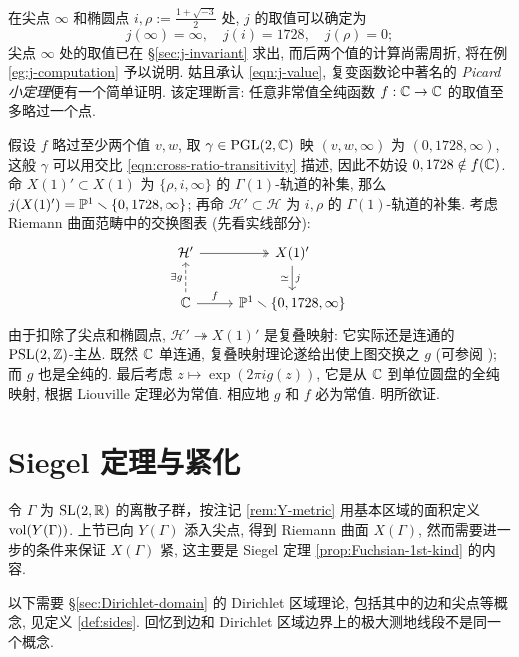 \begin{example} 
	在尖点 $\infty$ 和椭圆点 $i, \rho := \frac{1 + \sqrt{-3}}{2}$ 处, $j$ 的取值可以确定为
	\begin{equation}\label{eqn:j-value}
		j(\infty)=\infty, \quad j(i)=1728, \quad j(\rho) = 0;
	\end{equation}
	尖点 $\infty$ 处的取值已在 \S\ref{sec:j-invariant} 求出, 而后两个值的计算尚需周折, 将在例 \ref{eg:j-computation} 予以说明. 姑且承认 \eqref{eqn:j-value}, 复变函数论中著名的 \emph{Picard 小定理}便有一个简单证明. 该定理断言: 任意非常值全纯函数 $f: \mathbb{C} \to \mathbb{C}$ 的取值至多略过一个点.
	
	假设 $f$ 略过至少两个值 $v,w$, 取 $\gamma \in \operatorname{PGL}(2,\mathbb{C})$ 映 $(v,w,\infty)$ 为 $(0,1728,\infty)$, 这般 $\gamma$ 可以用交比 \eqref{eqn:cross-ratio-transitivity} 描述, 因此不妨设 $0, 1728 \notin f(\mathbb{C})$. 命 $X(1)' \subset X(1)$ 为 $\{\rho ,i, \infty\}$ 的 $\Gamma(1)$-轨道的补集, 那么 $j(X(1)') = \mathbb{P}^1 \smallsetminus \{0,1728,\infty\}$; 再命 $\mathcal{H}' \subset \mathcal{H}$ 为 $i, \rho$ 的 $\Gamma(1)$-轨道的补集. 考虑 Riemann 曲面范畴中的交换图表 (先看实线部分):
	\[\begin{tikzcd}
		\mathcal{H}' \arrow[twoheadrightarrow, r] & X(1)' \arrow[d, "j", "\simeq"'] \\
		\CC \arrow[dashed, u, "\exists g"] \arrow[r, "f"] & \PP^1 \smallsetminus \{0,1728,\infty\}
	\end{tikzcd}\]
	由于扣除了尖点和椭圆点, $\mathcal{H}' \twoheadrightarrow X(1)'$ 是复叠映射: 它实际还是连通的 $\operatorname{PSL}(2,\mathbb{Z})$-主丛. 既然 $\mathbb{C}$ 单连通, 复叠映射理论遂给出使上图交换之 $g$ (可参阅 \cite[定理 5.3]{You}); 而 $g$ 也是全纯的. 最后考虑 $z \mapsto \exp(2\pi i g(z))$, 它是从 $\mathbb{C}$ 到单位圆盘的全纯映射, 根据 Liouville 定理必为常值. 相应地 $g$ 和 $f$ 必为常值. 明所欲证.
\end{example}

\section{Siegel 定理与紧化}\label{sec:Siegel-thm}
令 $\Gamma$ 为 $\operatorname{SL}(2,\mathbb{R})$ 的离散子群，按注记 \ref{rem:Y-metric} 用基本区域的面积定义 $\operatorname{vol}(Y(\Gamma))$. 上节已向 $Y(\Gamma)$ 添入尖点, 得到 Riemann 曲面 $X(\Gamma)$, 然而需要进一步的条件来保证 $X(\Gamma)$ 紧, 这主要是 Siegel 定理 \ref{prop:Fuchsian-1st-kind} 的内容.

以下需要 \S\ref{sec:Dirichlet-domain} 的 Dirichlet 区域理论, 包括其中的边和尖点等概念, 见定义 \ref{def:sides}. 回忆到边和 Dirichlet 区域边界上的极大测地线段不是同一个概念.

